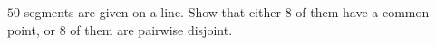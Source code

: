 $50$ segments are given on a line. Show that either $8$ of them have a common point, or $8$ of them are pairwise disjoint.
